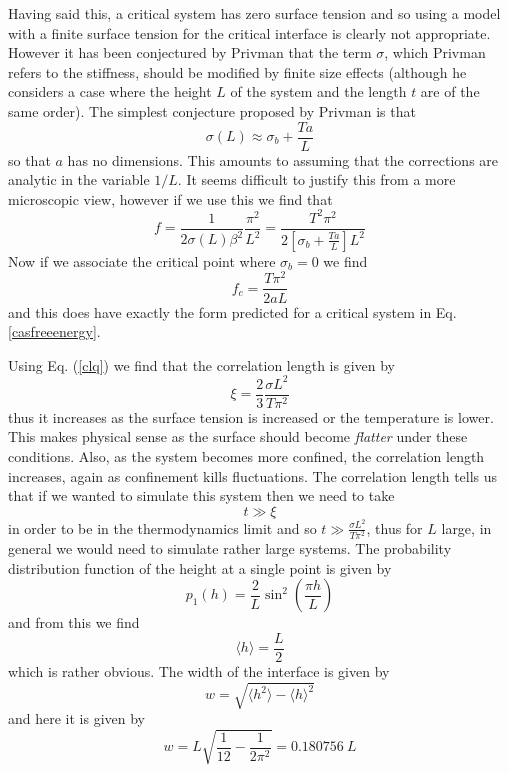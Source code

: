Having said this, a critical system has zero surface tension and so using a model with a finite surface tension for the {\color{red}critical} interface is clearly not appropriate. However it has been conjectured by Privman \cite{privman_finite-size_1988-1}  that the term $\sigma$, which Privman refers to the stiffness, should be modified by finite size effects (although he considers a case where the height $L$ of the system and the length $t$ are of the same order).
 The simplest conjecture proposed by Privman\cite{privman_finite-size_1988-1} is that
\begin{equation}
\sigma(L)\approx \sigma_b + \frac{T a}{L}
\end{equation}
so that $a$ has no dimensions.
This amounts to  assuming that the corrections are analytic in the variable $1/L$. It seems difficult to justify this from a more microscopic view, however if we use this we find that
\begin{equation}
f = \frac{1}{2\sigma(L)\beta^2}\frac{\pi^2}{L^2}= \frac{T^2\pi^2}{2[ \sigma_b + \frac{T a}{L}]L^2}
\end{equation}
Now if we associate the critical point where $\sigma_b=0$ we find
\begin{equation}
f_c= \frac{T\pi^2}{2 a L}
\end{equation}
and this does have exactly the form predicted for a critical system in Eq. \eqref{casfreeenergy}.

Using Eq. (\ref{clq}) we find that  the correlation length is given by
\begin{equation}
\xi = \frac{2}{3}\frac{\sigma L^2}{T\pi^2}\label{corel}
\end{equation}
thus it increases as the surface tension is increased or the temperature is lower. This makes physical sense as the surface should become {\em flatter} under these conditions. Also, as the system becomes more confined, the correlation length increases, again as  confinement  
kills fluctuations. The correlation length tells us that if we wanted to simulate this system then we need to take
\begin{equation}
t\gg \xi 
\end{equation}
in order to be in the thermodynamics limit and so $t \gg \frac{\sigma L^2}{T\pi^2}$, thus for 
$L$ large, in general we would need to simulate rather large systems.
The probability distribution function of the height at a single point is given by
\begin{equation}
p_1(h) =\frac{2}{L}\sin^2(\frac{\pi h}{L})
\end{equation}
and from this we find 
\begin{equation}
\langle h\rangle = \frac{L}{2}  
\end{equation}
which is rather obvious. The width of the interface is given by 
\begin{equation}
w=\sqrt{\langle h^2\rangle - \langle h\rangle^2}
\end{equation}
and here it is given by
\begin{equation}
w= L\sqrt{\frac{1}{12}-\frac{1}{2\pi^2}}= 0.180756\  L
\end{equation}


